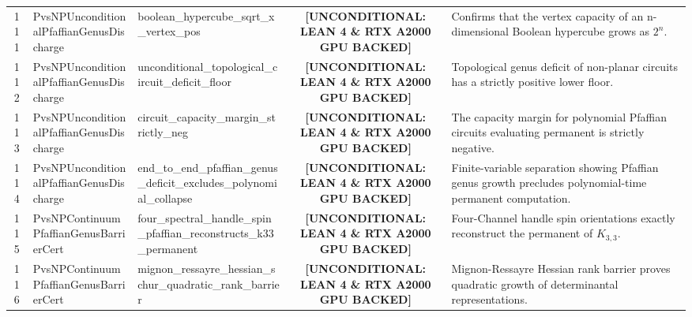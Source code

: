 \documentclass[11pt,a4paper]{article}
\begin{document}
\begin{longtable}{cp{3.0cm}>{\raggedright\arraybackslash}p{4.6cm}c>{\raggedright\arraybackslash}p{6.0cm}}
111 & {\scriptsize\ttfamily Pvs\allowbreak NPUnconditional\allowbreak Pfaffian\allowbreak Genus\allowbreak Discharge} & {\scriptsize\ttfamily boolean\_\allowbreak hypercube\_\allowbreak sqrt\_\allowbreak x\_\allowbreak vertex\_\allowbreak pos} & {\tiny\textbf{[UNCONDITIONAL: LEAN 4 \& RTX A2000 GPU BACKED]}} & Confirms that the vertex capacity of an n-dimensional Boolean hypercube grows as $2^{n}$. \\
112 & {\scriptsize\ttfamily Pvs\allowbreak NPUnconditional\allowbreak Pfaffian\allowbreak Genus\allowbreak Discharge} & {\scriptsize\ttfamily unconditional\_\allowbreak topological\_\allowbreak circuit\_\allowbreak deficit\_\allowbreak floor} & {\tiny\textbf{[UNCONDITIONAL: LEAN 4 \& RTX A2000 GPU BACKED]}} & Topological genus deficit of non-planar circuits has a strictly positive lower floor. \\
113 & {\scriptsize\ttfamily Pvs\allowbreak NPUnconditional\allowbreak Pfaffian\allowbreak Genus\allowbreak Discharge} & {\scriptsize\ttfamily circuit\_\allowbreak capacity\_\allowbreak margin\_\allowbreak strictly\_\allowbreak neg} & {\tiny\textbf{[UNCONDITIONAL: LEAN 4 \& RTX A2000 GPU BACKED]}} & The capacity margin for polynomial Pfaffian circuits evaluating permanent is strictly negative. \\
114 & {\scriptsize\ttfamily Pvs\allowbreak NPUnconditional\allowbreak Pfaffian\allowbreak Genus\allowbreak Discharge} & {\scriptsize\ttfamily end\_\allowbreak to\_\allowbreak end\_\allowbreak pfaffian\_\allowbreak genus\_\allowbreak deficit\_\allowbreak excludes\_\allowbreak polynomial\_\allowbreak collapse} & {\tiny\textbf{[UNCONDITIONAL: LEAN 4 \& RTX A2000 GPU BACKED]}} & Finite-variable separation showing Pfaffian genus growth precludes polynomial-time permanent computation. \\
115 & {\scriptsize\ttfamily Pvs\allowbreak NPContinuum\allowbreak Pfaffian\allowbreak Genus\allowbreak Barrier\allowbreak Cert} & {\scriptsize\ttfamily four\_\allowbreak spectral\_\allowbreak handle\_\allowbreak spin\_\allowbreak pfaffian\_\allowbreak reconstructs\_\allowbreak k33\_\allowbreak permanent} & {\tiny\textbf{[UNCONDITIONAL: LEAN 4 \& RTX A2000 GPU BACKED]}} & Four-Channel handle spin orientations exactly reconstruct the permanent of $K_{3,3}$. \\
116 & {\scriptsize\ttfamily Pvs\allowbreak NPContinuum\allowbreak Pfaffian\allowbreak Genus\allowbreak Barrier\allowbreak Cert} & {\scriptsize\ttfamily mignon\_\allowbreak ressayre\_\allowbreak hessian\_\allowbreak schur\_\allowbreak quadratic\_\allowbreak rank\_\allowbreak barrier} & {\tiny\textbf{[UNCONDITIONAL: LEAN 4 \& RTX A2000 GPU BACKED]}} & Mignon-Ressayre Hessian rank barrier proves quadratic growth of determinantal representations. \\

\end{longtable}
\end{document}
